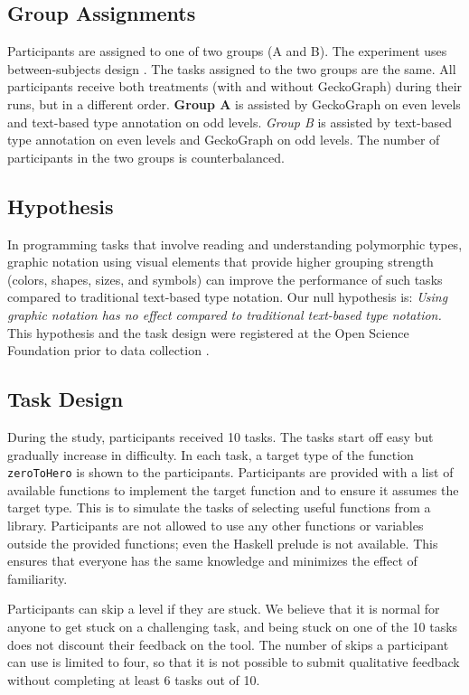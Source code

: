 \documentclass[preprint,12pt]{elsarticle}
\begin{document}
\subsection{Group Assignments}

Participants are assigned to one of two groups (A and B). The experiment uses between-subjects design \cite{Fisher1949-fn}.  The tasks assigned to the two groups are the same. All participants receive both treatments (with and without GeckoGraph) during their runs, but in a different order.   {\bf Group A} is assisted by GeckoGraph on even levels and text-based type annotation on odd levels. {\it Group B} is assisted by text-based type annotation on even levels and GeckoGraph on odd levels. The number of participants in the two groups is counterbalanced.

\subsection{Hypothesis}
In programming tasks that involve reading and understanding polymorphic types, graphic notation using visual elements that provide higher grouping strength (colors, shapes, sizes, and symbols) can improve the performance of such tasks compared to traditional text-based type notation. Our null hypothesis is: {\it Using graphic notation has no effect compared to traditional text-based type notation.} This hypothesis and the task design were registered at the Open Science Foundation prior to data collection \cite{Stuckey2023-vl}. 

\subsection{Task Design} \label{subsection:task}
During the study, participants received 10 tasks. The tasks start off easy but gradually increase in difficulty.  In each task, a target type of the function \texttt{zeroToHero} is shown to the participants. Participants are provided with a list of available functions to implement the target function and to ensure it assumes the target type. This is to simulate the tasks of selecting useful functions from a library. Participants are not allowed to use any other functions or variables outside the provided functions; even the Haskell prelude is not available. This ensures that everyone has the same knowledge and minimizes the effect of familiarity. 

Participants can skip a level if they are stuck. We believe that it is normal for anyone to get stuck on a challenging task, and being stuck on one of the 10 tasks does not discount their feedback on the tool. The number of skips a participant can use is limited to four, so that it is not possible to submit qualitative feedback without completing at least 6 tasks out of 10. 
\end{document}
